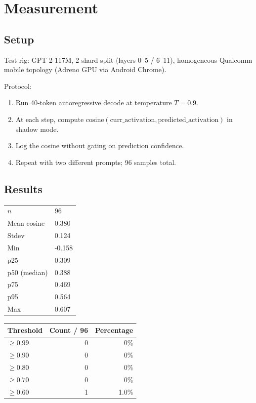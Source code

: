 \documentclass[11pt,letterpaper]{article}
\begin{document}
\section{Measurement}

\subsection{Setup}

Test rig: GPT-2 117M, 2-shard split (layers 0–5 / 6–11), homogeneous Qualcomm mobile topology (Adreno GPU via Android Chrome).

Protocol:
\begin{enumerate}
\item Run 40-token autoregressive decode at temperature $T=0.9$.
\item At each step, compute $\text{cosine}(\text{curr\_activation}, \text{predicted\_activation})$ in shadow mode.
\item Log the cosine without gating on prediction confidence.
\item Repeat with two different prompts; 96 samples total.
\end{enumerate}

\subsection{Results}

\begin{table}[h]
\centering
\begin{tabular}{ll}
\toprule
$n$ & 96 \\
Mean cosine & 0.380 \\
Stdev & 0.124 \\
Min & -0.158 \\
p25 & 0.309 \\
p50 (median) & 0.388 \\
p75 & 0.469 \\
p95 & 0.564 \\
Max & 0.607 \\
\bottomrule
\end{tabular}
\end{table}

\begin{table}[h]
\centering
\begin{tabular}{lrr}
\toprule
Threshold & Count / 96 & Percentage \\
\midrule
$\geq 0.99$ & 0 & 0\% \\
$\geq 0.90$ & 0 & 0\% \\
$\geq 0.80$ & 0 & 0\% \\
$\geq 0.70$ & 0 & 0\% \\
$\geq 0.60$ & 1 & 1.0\% \\
\bottomrule
\end{tabular}
\end{table}
\end{document}
